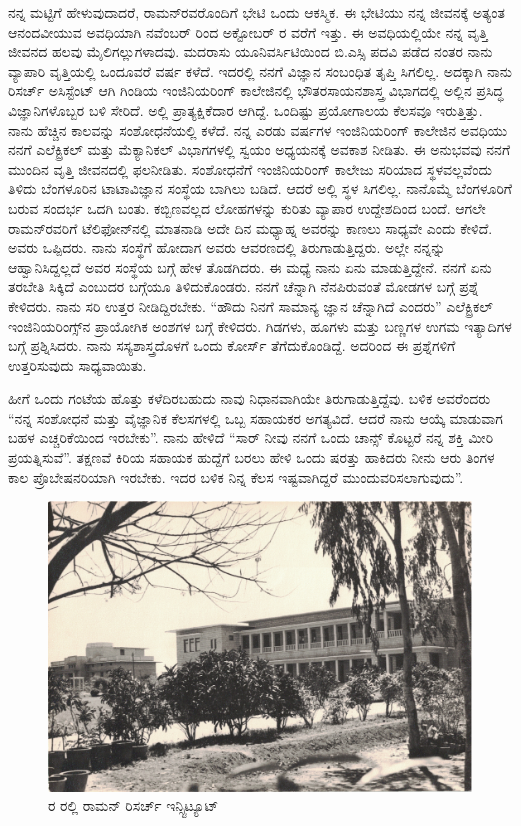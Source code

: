ನನ್ನ ಮಟ್ಟಿಗೆ ಹೇಳುವುದಾದರೆ, ರಾಮನ್‍ರವರೊಂದಿಗೆ ಭೇಟಿ ಒಂದು ಆಕಸ್ಮಿಕ. ಈ ಭೇಟಿಯು ನನ್ನ ಜೀವನಕ್ಕೆ ಅತ್ಯಂತ ಆನಂದವೀಯುವ ಅವಧಿಯಾಗಿ ನವೆಂಬರ್ ರಿಂದ ಅಕ್ಟೋಬರ್ ರ ವರೆಗೆ ಇತ್ತು. ಈ ಅವಧಿಯಲ್ಲಿಯೇ ನನ್ನ ವೃತ್ತಿ ಜೀವನದ ಹಲವು ಮೈಲಿಗಲ್ಲುಗಳಾದವು. ಮದರಾಸು ಯೂನಿವರ್ಸಿಟಿಯಿಂದ ಬಿ.ಎಸ್ಸಿ ಪದವಿ ಪಡೆದ ನಂತರ ನಾನು ವ್ಯಾಪಾರಿ ವೃತ್ತಿಯಲ್ಲಿ ಒಂದೂವರೆ ವರ್ಷ ಕಳೆದೆ. ಇದರಲ್ಲಿ ನನಗೆ ವಿಜ್ಞಾನ ಸಂಬಂಧಿತ ತೃಪ್ತಿ ಸಿಗಲಿಲ್ಲ. ಅದಕ್ಕಾಗಿ ನಾನು ರಿಸರ್ಚ್ ಅಸಿಸ್ಟೆಂಟ್ ಆಗಿ ಗಿಂಡಿಯ ಇಂಜಿನಿಯರಿಂಗ್ ಕಾಲೇಜಿನಲ್ಲಿ ಭೌತರಸಾಯನಶಾಸ್ತ್ರ ವಿಭಾಗದಲ್ಲಿ ಅಲ್ಲಿನ ಪ್ರಸಿದ್ಧ ವಿಜ್ಞಾನಿಗಳೊಬ್ಬರ ಬಳಿ ಸೇರಿದೆ. ಅಲ್ಲಿ ಪ್ರಾತ್ಯಕ್ಷಿಕೆದಾರ ಆಗಿದ್ದೆ. ಒಂದಿಷ್ಟು ಪ್ರಯೋಗಾಲಯ ಕೆಲಸವೂ ಇರುತ್ತಿತ್ತು. ನಾನು ಹೆಚ್ಚಿನ ಕಾಲವನ್ನು ಸಂಶೋಧನೆಯಲ್ಲಿ ಕಳೆದೆ. ನನ್ನ ಎರಡು ವರ್ಷಗಳ ಇಂಜಿನಿಯರಿಂಗ್ ಕಾಲೇಜಿನ ಅವಧಿಯು ನನಗೆ ಎಲೆಕ್ಟ್ರಿಕಲ್ ಮತ್ತು ಮೆಕ್ಯಾನಿಕಲ್ ವಿಭಾಗಗಳಲ್ಲಿ ಸ್ವಯಂ ಅಧ್ಯಯನಕ್ಕೆ ಅವಕಾಶ ನೀಡಿತು. ಈ ಅನುಭವವು ನನಗೆ ಮುಂದಿನ ವೃತ್ತಿ ಜೀವನದಲ್ಲಿ ಫಲನೀಡಿತು. ಸಂಶೋಧನೆಗೆ ಇಂಜಿನಿಯರಿಂಗ್ ಕಾಲೇಜು ಸರಿಯಾದ ಸ್ಥಳವಲ್ಲವೆಂದು ತಿಳಿದು ಬೆಂಗಳೂರಿನ ಟಾಟಾವಿಜ್ಞಾನ ಸಂಸ್ಥೆಯ ಬಾಗಿಲು ಬಡಿದೆ. ಆದರೆ ಅಲ್ಲಿ ಸ್ಥಳ ಸಿಗಲಿಲ್ಲ. ನಾನೊಮ್ಮೆ ಬೆಂಗಳೂರಿಗೆ ಬರುವ ಸಂದರ್ಭ ಒದಗಿ ಬಂತು. ಕಬ್ಬಿಣವಲ್ಲದ ಲೋಹಗಳನ್ನು ಕುರಿತು ವ್ಯಾಪಾರ ಉದ್ದೇಶದಿಂದ ಬಂದೆ. ಆಗಲೇ ರಾಮನ್‍ರವರಿಗೆ ಟೆಲಿಫೋನ್‍ನಲ್ಲಿ ಮಾತನಾಡಿ ಅದೇ ದಿನ ಮಧ್ಯಾಹ್ನ ಅವರನ್ನು ಕಾಣಲು ಸಾಧ್ಯವೇ ಎಂದು ಕೇಳಿದೆ. ಅವರು ಒಪ್ಪಿದರು. ನಾನು ಸಂಸ್ಥೆಗೆ ಹೋದಾಗ ಅವರು ಆವರಣದಲ್ಲಿ ತಿರುಗಾಡುತ್ತಿದ್ದರು. ಅಲ್ಲೇ ನನ್ನನ್ನು ಆಹ್ವಾನಿಸಿದ್ದಲ್ಲದೆ ಅವರ ಸಂಸ್ಥೆಯ ಬಗ್ಗೆ ಹೇಳ ತೊಡಗಿದರು. ಈ ಮಧ್ಯೆ ನಾನು ಏನು ಮಾಡುತ್ತಿದ್ದೇನೆ. ನನಗೆ ಏನು ತರಬೇತಿ ಸಿಕ್ಕಿದೆ ಎಂಬುದರ ಬಗ್ಗೆಯೂ ತಿಳಿದುಕೊಂಡರು. ನನಗೆ ಚೆನ್ನಾಗಿ ನೆನಪಿರುವಂತೆ ಮೋಡಗಳ ಬಗ್ಗೆ ಪ್ರಶ್ನೆ ಕೇಳಿದರು. ನಾನು ಸರಿ ಉತ್ತರ ನೀಡಿದ್ದಿರಬೇಕು. “ಹೌದು ನಿನಗೆ ಸಾಮಾನ್ಯ ಜ್ಞಾನ ಚೆನ್ನಾಗಿದೆ ಎಂದರು” ಎಲೆಕ್ಟ್ರಿಕಲ್ ಇಂಜಿನಿಯರಿಂಗ್ಸ್‌ನ ಪ್ರಾಯೋಗಿಕ ಅಂಶಗಳ ಬಗ್ಗೆ ಕೇಳಿದರು. ಗಿಡಗಳು, ಹೂಗಳು ಮತ್ತು ಬಣ್ಣಗಳ ಉಗಮ ಇತ್ಯಾದಿಗಳ ಬಗ್ಗೆ ಪ್ರಶ್ನಿಸಿದರು. ನಾನು ಸಸ್ಯಶಾಸ್ತ್ರದೊಳಗೆ ಒಂದು ಕೋರ್ಸ್ ತೆಗೆದುಕೊಂಡಿದ್ದೆ. ಅದರಿಂದ ಈ ಪ್ರಶ್ನೆಗಳಿಗೆ ಉತ್ತರಿಸುವುದು ಸಾಧ್ಯವಾಯಿತು.

ಹೀಗೆ ಒಂದು ಗಂಟೆಯ ಹೊತ್ತು ಕಳೆದಿರಬಹುದು ನಾವು ನಿಧಾನವಾಗಿಯೇ ತಿರುಗಾಡುತ್ತಿದ್ದೆವು. ಬಳಿಕ ಅವರೆಂದರು  “ನನ್ನ ಸಂಶೋಧನೆ ಮತ್ತು ವೈಜ್ಞಾನಿಕ ಕೆಲಸಗಳಲ್ಲಿ ಒಬ್ಬ ಸಹಾಯಕರ ಅಗತ್ಯವಿದೆ. ಆದರೆ ನಾನು ಆಯ್ಕೆ ಮಾಡುವಾಗ ಬಹಳ ಎಚ್ಚರಿಕೆಯಿಂದ ಇರಬೇಕು”. ನಾನು ಹೇಳಿದೆ “ಸಾರ್ ನೀವು ನನಗೆ ಒಂದು ಚಾನ್ಸ್ ಕೊಟ್ಟರೆ ನನ್ನ ಶಕ್ತಿ ಮೀರಿ ಪ್ರಯತ್ನಿಸುವೆ”. ತಕ್ಷಣವೆ ಕಿರಿಯ ಸಹಾಯಕ ಹುದ್ದೆಗೆ ಬರಲು ಹೇಳಿ ಒಂದು ಷರತ್ತು ಹಾಕಿದರು  ನೀನು ಆರು ತಿಂಗಳ ಕಾಲ ಪ್ರೊಬೇಷನರಿಯಾಗಿ ಇರಬೇಕು. ಇದರ ಬಳಿಕ ನಿನ್ನ ಕೆಲಸ ಇಷ್ಟವಾಗಿದ್ದರೆ ಮುಂದುವರಿಸಲಾಗುವುದು”.

\begin{figure}
\centering
\includegraphics{"images/7.jpg"}
\caption{ರ ರಲ್ಲಿ ರಾಮನ್ ರಿಸರ್ಚ್ ಇನ್ಸ್ಟಿಟ್ಯೂಟ್}\label{chap2-fig01}
\end{figure}


